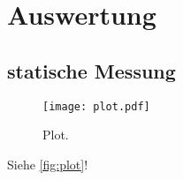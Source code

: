 \section{Auswertung}
\label{sec:Auswertung}

\subsection{statische Messung}
\label{subsec:stat}


\begin{figure}
  \centering
  \texttt{[image: plot.pdf]}
  \caption{Plot.}
  \label{fig:plot}
\end{figure}


Siehe \autoref{fig:plot}!
